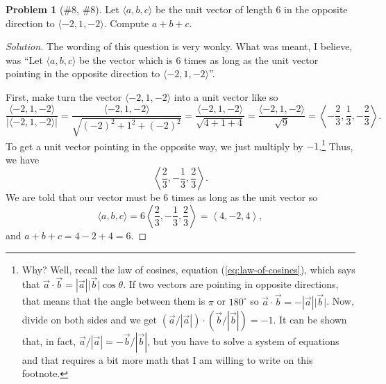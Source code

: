 \documentclass{article}
\theoremstyle{plain}
\theoremstyle{definition}
\newtheorem{problem}[exercise]{Problem}
\theoremstyle{remark}
\begin{document}
\begin{problem}[{\color{Green}\#8}, {\color{Red}\#8}]
Let $\langle a,b,c\rangle$ be the unit vector of length $6$ in the opposite
direction to $\langle -2,1,-2\rangle$. Compute $a+b+c$.
\end{problem}
\begin{proof}[Solution]
The wording of this question is very wonky. What was meant, I believe, was
``Let $\langle a,b,c\rangle$ be the vector which is $6$ times as long as
the unit vector pointing in the opposite direction to $\langle
-2,1,-2\rangle$''.

First, make turn the vector $\langle -2,1,-2\rangle$ into a unit vector
like so
\[
\frac{\langle -2,1,-2 \rangle}{\left|\langle -2,1,-2\rangle\right|}=
\frac{\langle -2,1,-2 \rangle}{\sqrt{(-2)^2+1^2+(-2)^2}}=
\frac{\langle -2,1,-2 \rangle}{\sqrt{4+1+4}}=
\frac{\langle -2,1,-2 \rangle}{\sqrt{9}}=
\left<-\frac{2}{3},\frac{1}{3},-\frac{2}{3}\right>.
\]
To get a unit vector pointing in the opposite way, we just multiply by
$-1$.\footnote{Why? Well, recall the law of cosines, equation
  (\ref{eq:law-of-cosines}), which says that
  $\vec a\cdot\vec b=\left|\vec a\right|\bigl|\vec b\bigr|\cos\theta$. If
  two vectors are pointing in opposite directions, that means that the
  angle between them is $\pi$ or $180^\circ$ so
  $\vec a\cdot\vec b=-\left|\vec a\right|\bigl|\vec b\bigr|$. Now, divide
  on both sides and we get $(\vec a/|\vec a|)\cdot(\vec b/|\vec b|)=-1$. It
  can be shown that, in fact, $\vec a/|\vec a|=-\vec b/|\vec b|$, but you
  have to solve a system of equations and that requires a bit more math
  that I am willing to write on this footnote.}
Thus, we have
\[
\left<\frac{2}{3},-\frac{1}{3},\frac{2}{3}\right>.
\]
We are told that our vector must be $6$ times as long as the unit vector so
\[
\langle a,b,c \rangle=
6\left<\frac{2}{3},-\frac{1}{3},\frac{2}{3}\right>=
\left<4,-2,4\right>,
\]
and $\boxed{a+b+c=4-2+4=6}$.
\end{proof}
\end{document}
